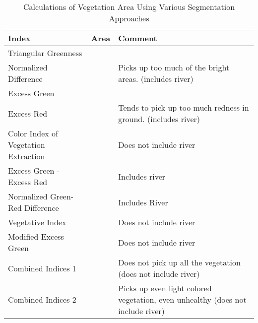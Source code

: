 \documentclass[letterpaper]{article}
\begin{document}
{%
{\renewcommand{\arraystretch}{2}%
\begin{table}[H]
    \caption{Calculations of Vegetation Area Using Various Segmentation Approaches}
    \label{fig:calculations}
    \begin{tabular}{  l  p{4cm}  p{5cm} }
        \toprule
\textbf{Index}      
& \textbf{Area}   
& \textbf{Comment} \\\midrule
Triangular Greenness
&  
& \\\hline
Normalized Difference     
&                   
&   Picks up too much of the bright areas. (includes river)\\\hline
Excess Green      
& 
& \\\hline
Excess Red      
& 
&  Tends to pick up too much redness in ground. (includes river)\\\hline
Color Index of Vegetation Extraction      
& 
& Does not include river\\\hline
Excess Green - Excess Red   
& 
& Includes river \\\hline
Normalized Green-Red Difference    
& 
& Includes River\\\hline
Vegetative Index      
& 
& Does not include river\\\hline
Modified Excess Green      
& 
& Does not include river\\\hline
Combined Indices 1  
&  
& Does not pick up all the vegetation (does not include river)\\\hline    
Combined Indices 2      
&  
& Picks up even light colored vegetation, even unhealthy (does not include river)\\\hline    

        \bottomrule
    \end{tabular}
\end{table}

}}
\end{document}

